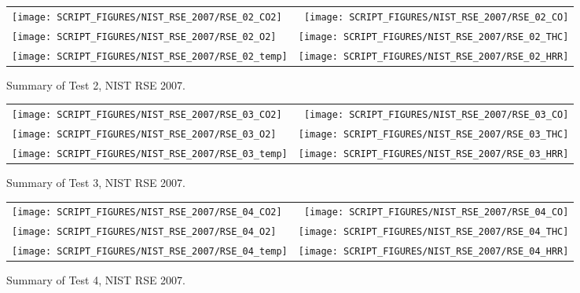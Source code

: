 \newpage

\begin{figure}[p]
\begin{tabular*}{\textwidth}{l@{\extracolsep{\fill}}r}
\texttt{[image: SCRIPT\_FIGURES/NIST\_RSE\_2007/RSE\_02\_CO2]} &
\texttt{[image: SCRIPT\_FIGURES/NIST\_RSE\_2007/RSE\_02\_CO]} \\
\texttt{[image: SCRIPT\_FIGURES/NIST\_RSE\_2007/RSE\_02\_O2]} &
\texttt{[image: SCRIPT\_FIGURES/NIST\_RSE\_2007/RSE\_02\_THC]} \\
\texttt{[image: SCRIPT\_FIGURES/NIST\_RSE\_2007/RSE\_02\_temp]} &
\texttt{[image: SCRIPT\_FIGURES/NIST\_RSE\_2007/RSE\_02\_HRR]}
\end{tabular*}
\caption[Summary of Test 2, NIST RSE 2007]{Summary of Test 2, NIST RSE 2007.}
\label{NIST_RSE_2007_2}
\end{figure}

\begin{figure}[p]
\begin{tabular*}{\textwidth}{l@{\extracolsep{\fill}}r}
\texttt{[image: SCRIPT\_FIGURES/NIST\_RSE\_2007/RSE\_03\_CO2]} &
\texttt{[image: SCRIPT\_FIGURES/NIST\_RSE\_2007/RSE\_03\_CO]} \\
\texttt{[image: SCRIPT\_FIGURES/NIST\_RSE\_2007/RSE\_03\_O2]} &
\texttt{[image: SCRIPT\_FIGURES/NIST\_RSE\_2007/RSE\_03\_THC]} \\
\texttt{[image: SCRIPT\_FIGURES/NIST\_RSE\_2007/RSE\_03\_temp]} &
\texttt{[image: SCRIPT\_FIGURES/NIST\_RSE\_2007/RSE\_03\_HRR]}
\end{tabular*}
\caption[Summary of Test 3, NIST RSE 2007]{Summary of Test 3, NIST RSE 2007.}
\label{NIST_RSE_2007_3}
\end{figure}

\begin{figure}[p]
\begin{tabular*}{\textwidth}{l@{\extracolsep{\fill}}r}
\texttt{[image: SCRIPT\_FIGURES/NIST\_RSE\_2007/RSE\_04\_CO2]} &
\texttt{[image: SCRIPT\_FIGURES/NIST\_RSE\_2007/RSE\_04\_CO]} \\
\texttt{[image: SCRIPT\_FIGURES/NIST\_RSE\_2007/RSE\_04\_O2]} &
\texttt{[image: SCRIPT\_FIGURES/NIST\_RSE\_2007/RSE\_04\_THC]} \\
\texttt{[image: SCRIPT\_FIGURES/NIST\_RSE\_2007/RSE\_04\_temp]} &
\texttt{[image: SCRIPT\_FIGURES/NIST\_RSE\_2007/RSE\_04\_HRR]}
\end{tabular*}
\caption[Summary of Test 4, NIST RSE 2007]{Summary of Test 4, NIST RSE 2007.}
\label{NIST_RSE_2007_4}
\end{figure}

